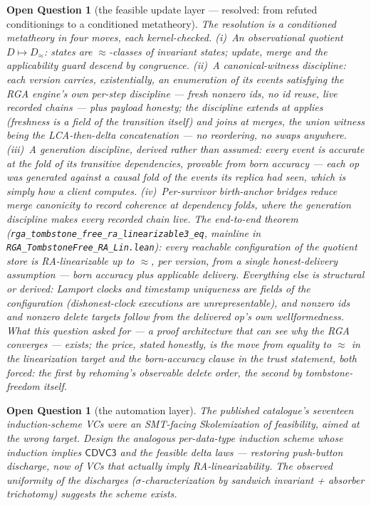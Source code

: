 \documentclass[11pt]{article}
\newtheorem{openq}[theorem]{Open Question}
\newcommand{\cd}{\mathsf{CDVC3}}
\newcommand{\lean}[1]{\texttt{#1}}
\begin{document}
\begin{openq}[the feasible update layer --- resolved: from refuted
conditionings to a conditioned metatheory]
The resolution is a conditioned \emph{metatheory} in four moves, each
kernel-checked. (i)~An observational quotient $D \mapsto D_\approx$:
states are $\approx$-classes of invariant states; update, merge and the
applicability guard descend by congruence. (ii)~A canonical-witness
discipline: each version carries, existentially, an enumeration of its
events satisfying the RGA engine's own per-step discipline --- fresh
nonzero ids, no id reuse, live recorded chains --- plus payload honesty;
the discipline \emph{extends} at applies (freshness is a field of the
transition itself) and \emph{joins} at merges, the union witness being
the LCA-then-delta concatenation --- no reordering, no swaps anywhere.
(iii)~A generation discipline, derived rather than assumed: every event
is accurate at the fold of its \emph{transitive dependencies}, provable
from \emph{born accuracy} --- each op was generated against a causal
fold of the events its replica had seen, which is simply how a client
computes. (iv)~Per-survivor \emph{birth-anchor bridges} reduce merge
canonicity to record coherence at dependency folds, where the
generation discipline makes every recorded chain live. The end-to-end
theorem (\lean{rga\_tombstone\_free\_ra\_linearizable3\_eq}, mainline in
\lean{RGA\_TombstoneFree\_RA\_Lin.lean}): every reachable configuration
of the quotient store is RA-linearizable up to $\approx$, per version,
from a single honest-delivery assumption --- born accuracy plus
applicable delivery. Everything else is structural or derived: Lamport
clocks and timestamp uniqueness are fields of the configuration
(dishonest-clock executions are unrepresentable), and nonzero ids and
nonzero delete targets follow from the delivered op's own
wellformedness. What this question asked for --- a proof architecture
that can see why the RGA converges --- exists; the price, stated
honestly, is the move from equality to $\approx$ in the linearization
target and the born-accuracy clause in the trust statement, both
forced: the first by rehoming's observable delete order, the second by
tombstone-freedom itself.
\end{openq}

\begin{openq}[the automation layer]
The published catalogue's seventeen induction-scheme VCs were an
SMT-facing Skolemization of feasibility, aimed at the wrong target.
Design the analogous per-data-type induction scheme whose induction
implies $\cd$ and the feasible delta laws --- restoring push-button
discharge, now of VCs that actually imply RA-linearizability. The
observed uniformity of the discharges ($\sigma$-characterization by
sandwich invariant + absorber trichotomy) suggests the scheme exists.
\end{openq}
\end{document}
